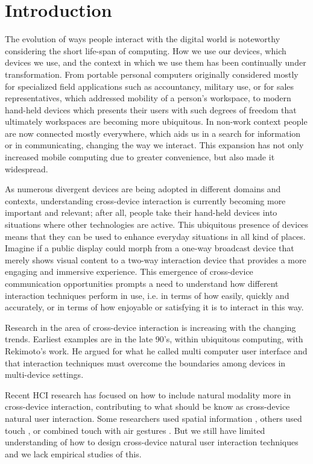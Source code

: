 \section{Introduction} \label{sec:introduction}
The evolution of ways people interact with the digital world is noteworthy considering the short life-span of computing. How we use our devices, which devices we use, and the context in which we use them has been continually under transformation. 
From portable personal computers originally considered mostly for specialized field applications such as accountancy, military use, or for sales representatives, which addressed mobility of a person's workspace, to modern hand-held devices which presents their users with such degrees of freedom that ultimately workspaces are becoming more ubiquitous. 
In non-work context people are now connected mostly everywhere, which aids us in a search for information or in communicating, changing the way we interact. 
This expansion has not only increased mobile computing due to greater convenience, but also made it widespread.\cite{Francis:1997} 

As numerous divergent devices are being adopted in different domains and contexts, understanding cross-device interaction is currently becoming more important and relevant; after all, people take their hand-held devices into situations where other technologies are active. This ubiquitous presence of devices means that they can be used to enhance everyday situations in all kind of places. Imagine if a public display could morph from a one-way broadcast device that merely shows visual content to a two-way interaction device that provides a more engaging and immersive experience. This emergence of cross-device communication opportunities prompts a need to understand how different interaction techniques perform in use, i.e. in terms of how easily, quickly and accurately, or in terms of how enjoyable or satisfying it is to interact in this way.

Research in the area of cross-device interaction is increasing with the changing trends. Earliest examples are in the late 90's, within ubiquitous computing, with Rekimoto's work.  He argued for what he called multi computer user interface and that interaction techniques must overcome the boundaries among devices in multi-device settings\cite{Rekimoto:1998}.

Recent HCI research has focused on how to include natural modality more in cross-device interaction, contributing to what should be know as cross-device natural user interaction.  Some researchers used spatial information \cite{Marquardt:2011, Marquardt:2012}, others used touch \cite{Seifert:2012}, or combined touch with air gestures \cite{Bragdon:2011} . But we still have limited understanding of how to design cross-device natural user interaction techniques and we lack empirical studies of this.

